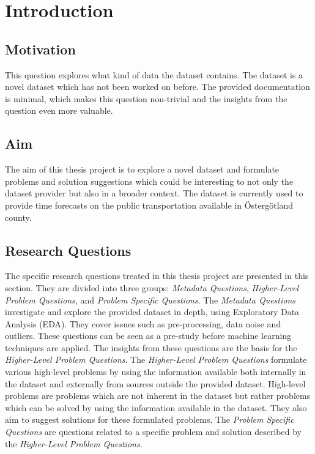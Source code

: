 \chapter{Introduction}
\label{cha:introduction}

\section{Motivation}
\label{sec:motivation}
This question explores what kind of data the dataset contains.
The dataset is a novel dataset which has not been worked on before.
The provided documentation is minimal, which makes this question non-trivial and the insights from the question even more valuable.

\section{Aim}
\label{sec:aim}
The aim of this thesis project is to explore a novel dataset and formulate problems and solution suggestions which could be interesting to not only the dataset provider but also in a broader context.
The dataset is currently used to provide time forecasts on the public transportation available in Östergötland county.

\section{Research Questions}
\label{sec:research-questions}
The specific research questions treated in this thesis project are presented in this section.
They are divided into three groups: \textit{Metadata Questions}, \textit{Higher-Level Problem Questions}, and \textit{Problem Specific Questions}.
The \textit{Metadata Questions} investigate and explore the provided dataset in depth, using Exploratory Data Analysis (EDA).
They cover issues such as pre-processing, data noise and outliers.
These questions can be seen as a pre-study before machine learning techniques are applied.
The insights from these questions are the basis for the \textit{Higher-Level Problem Questions}.
The \textit{Higher-Level Problem Questions} formulate various high-level problems by using the information available both internally in the dataset and externally from sources outside the provided dataset.
High-level problems are problems which are not inherent in the dataset but rather problems which can be solved by using the information available in the dataset.
They also aim to suggest solutions for these formulated problems.
The \textit{Problem Specific Questions} are questions related to a specific problem and solution described by the \textit{Higher-Level Problem Questions}.

